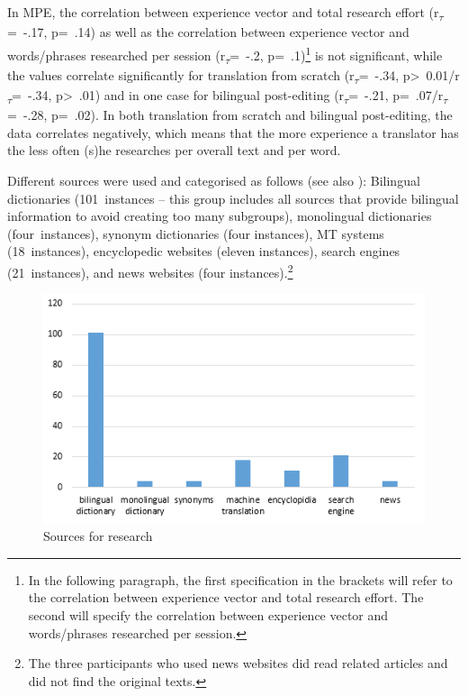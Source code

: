 \documentclass[output=paper]{langsci/langscibook}
\begin{document}
In MPE, the correlation between experience vector and total research effort (r\textsubscript{$\tau $}=~-.17,\textsubscript{ }p=~.14) as well as the correlation between experience vector and words/phrases researched per session (r\textsubscript{$\tau $}=~-.2,\textsubscript{ }p=~.1)\footnote{In the following paragraph, the first specification in the brackets will refer to the correlation between experience vector and total research effort. The second will specify the correlation between experience vector and words/phrases researched per session.} is not significant, while the values correlate significantly for translation from scratch (r\textsubscript{$\tau $}=~-.34, p{\textgreater}~0.01/r\textsubscript{$\tau $}=~-.34, p{\textgreater}~.01) and in one case for bilingual post-editing (r\textsubscript{$\tau $}=~-.21, p=~.07/r\textsubscript{$\tau $}=~-.28, p=~.02). In both translation from scratch and bilingual post-editing, the data correlates negatively, which means that the more experience a translator has the less often (s)he researches per overall text and per word. 



Different sources were used and categorised as follows (see also ): Bilingual dictionaries (101~instances -- this group includes all sources that provide bilingual information to avoid creating too many subgroups), monolingual dictionaries (four~instances), synonym dictionaries (four instances), MT systems (18~instances), encyclopedic websites (eleven instances), search engines (21~instances), and news websites (four instances).\footnote{The three participants who used news websites did read related articles and did not find the original texts.}


 
\begin{figure}[h]
 \includegraphics[width=\textwidth]{figures/Nitzke1.png}
 \caption{Sources for research}
 \label{nitzke:fig:1}
\end{figure} 
\end{document}

